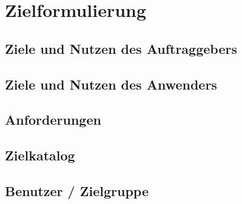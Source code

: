 \section{Zielformulierung}

\subsection{Ziele und Nutzen des Auftraggebers}

\subsection{Ziele und Nutzen des Anwenders}

\subsection{Anforderungen}

\subsection{Zielkatalog}

\subsection{Benutzer / Zielgruppe}
